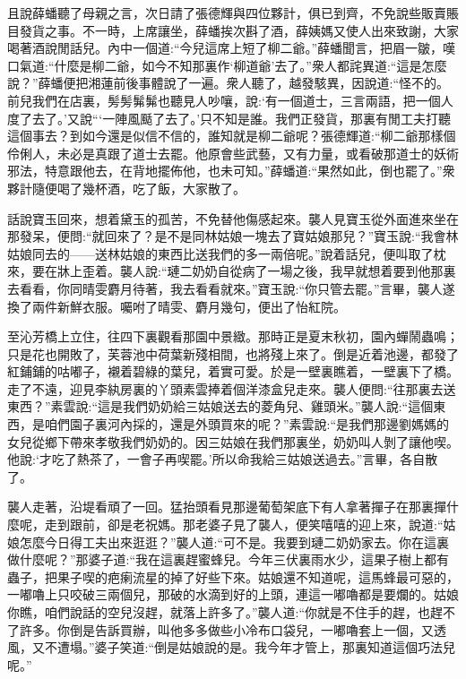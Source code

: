 \begin{parag}
    且說薛蟠聽了母親之言，次日請了張德輝與四位夥計，俱已到齊，不免說些販賣賬目發貨之事。不一時，上席讓坐，薛蟠挨次斟了酒，薛姨媽又使人出來致謝，大家喝著酒說閒話兒。內中一個道:“今兒這席上短了柳二爺。”薛蟠聞言，把眉一皺，嘆口氣道:“什麼是柳二爺，如今不知那裏作‘柳道爺’去了。”衆人都詫異道:“這是怎麼說？”薛蟠便把湘蓮前後事體說了一遍。衆人聽了，越發駭異，因說道:“怪不的。前兒我們在店裏，髣髣髴髴也聽見人吵嚷，說:‘有一個道士，三言兩語，把一個人度了去了。’又說“‘一陣風颳了去了。’只不知是誰。我們正發貨，那裏有閒工夫打聽這個事去？到如今還是似信不信的，誰知就是柳二爺呢？張德輝道:“柳二爺那樣個伶俐人，未必是真跟了道士去罷。他原會些武藝，又有力量，或看破那道士的妖術邪法，特意跟他去，在背地擺佈他，也未可知。”薛蟠道:“果然如此，倒也罷了。”衆夥計隨便喝了幾杯酒，吃了飯，大家散了。
\end{parag}


\begin{parag}
    話說寶玉回來，想着黛玉的孤苦，不免替他傷感起來。襲人見寶玉從外面進來坐在那發呆，便問:“就回來了？是不是同林姑娘一塊去了寶姑娘那兒？”寶玉說:“我會林姑娘同去的——送林姑娘的東西比送我們的多一兩倍呢。”說着話兒，便叫取了枕來，要在牀上歪着。襲人說:“璉二奶奶自從病了一場之後，我早就想着要到他那裏去看看，你同晴雯麝月待著，我去看看就來。”寶玉說:“你只管去罷。”言畢，襲人遂換了兩件新鮮衣服。囑咐了晴雯、麝月幾句，便出了怡紅院。
\end{parag}


\begin{parag}
    至沁芳橋上立住，往四下裏觀看那園中景緻。那時正是夏末秋初，園內蟬鬧蟲鳴；只是花也開敗了，芙蓉池中荷葉新殘相間，也將殘上來了。倒是近着池邊，都發了紅鋪鋪的咕嘟子，襯着碧綠的葉兒，着實可愛。於是一壁裏瞧着，一壁裏下了橋。走了不遠，迎見李紈房裏的丫頭素雲捧着個洋漆盒兒走來。襲人便問:“往那裏去送東西？”素雲說:“這是我們奶奶給三姑娘送去的菱角兒、雞頭米。”襲人說:“這個東西，是咱們園子裏河內採的，還是外頭買來的呢？”素雲說:“是我們那邊劉媽媽的女兒從鄉下帶來孝敬我們奶奶的。因三姑娘在我們那裏坐，奶奶叫人剝了讓他喫。他說:‘才吃了熱茶了，一會子再喫罷。’所以命我給三姑娘送過去。”言畢，各自散了。
\end{parag}


\begin{parag}
    襲人走著，沿堤看頑了一回。猛抬頭看見那邊葡萄架底下有人拿著撣子在那裏撣什麼呢，走到跟前，卻是老祝媽。那老婆子見了襲人，便笑嘻嘻的迎上來，說道:“姑娘怎麼今日得工夫出來逛逛？”襲人道:“可不是。我要到璉二奶奶家去。你在這裏做什麼呢？”那婆子道:“我在這裏趕蜜蜂兒。今年三伏裏雨水少，這果子樹上都有蟲子，把果子喫的疤瘌流星的掉了好些下來。姑娘還不知道呢，這馬蜂最可惡的，一嘟嚕上只咬破三兩個兒，那破的水滴到好的上頭，連這一嘟嚕都是要爛的。姑娘你瞧，咱們說話的空兒沒趕，就落上許多了。”襲人道:“你就是不住手的趕，也趕不了許多。你倒是告訴買辦，叫他多多做些小冷布口袋兒，一嘟嚕套上一個，又透風，又不遭塌。”婆子笑道:“倒是姑娘說的是。我今年才管上，那裏知道這個巧法兒呢。”
\end{parag}


